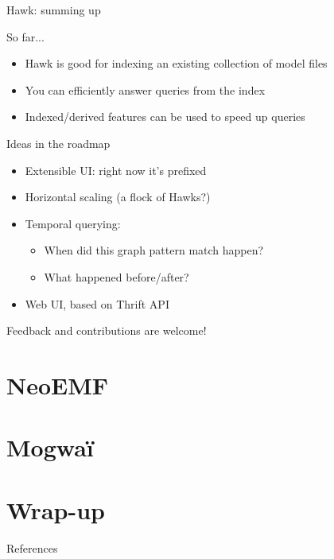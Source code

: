 \documentclass[10pt]{beamer}
\begin{document}
\begin{frame}{Hawk: summing up}

  \begin{block}{So far...}
    \begin{itemize}
    \item Hawk is good for indexing an existing collection of model files
    \item You can efficiently answer queries from the index
    \item Indexed/derived features can be used to speed up queries
    \end{itemize}
  \end{block}

  \begin{block}{Ideas in the roadmap}
    \begin{itemize}
    \item Extensible UI: right now it's prefixed
    \item Horizontal scaling (a flock of Hawks?)
    \item Temporal querying:
      \begin{itemize}
      \item When did this graph pattern match happen?
      \item What happened before/after?
      \end{itemize}
    \item Web UI, based on Thrift API
    \end{itemize}

    Feedback and contributions are welcome!
  \end{block}

\end{frame}

\section{NeoEMF}

\section{Mogwa\"i}

\section{Wrap-up}

\begin{frame}[allowframebreaks]{References}

  
  

\end{frame}
\end{document}
